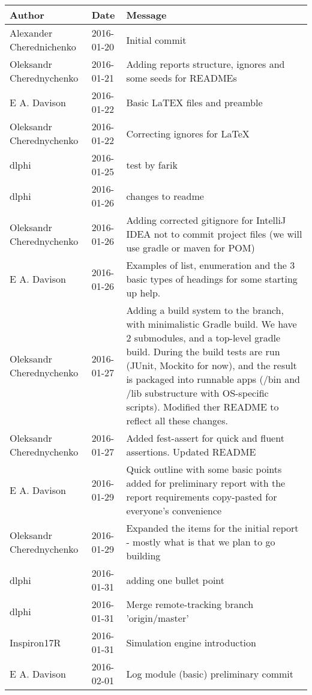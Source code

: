 \begin{center}
\begin{longtabu} to \textwidth {|
    X[3,l]|
    X[2,c]|
    X[8,l]|}
    \hline
    \textbf{Author} & \textbf{Date} & \textbf{Message} \\ \hline
Alexander Cherednichenko & 2016-01-20 & Initial commit \\ \hline
Oleksandr Cherednychenko & 2016-01-21 & Adding reports structure, ignores and some seeds for READMEs \\ \hline
E A. Davison & 2016-01-22 & Basic LaTEX files and preamble \\ \hline
Oleksandr Cherednychenko & 2016-01-22 & Correcting ignores for LaTeX \\ \hline
dlphi & 2016-01-25 & test by farik \\ \hline
dlphi & 2016-01-26 & changes to readme \\ \hline
Oleksandr Cherednychenko & 2016-01-26 & Adding corrected gitignore for IntelliJ IDEA not to commit project files (we will use gradle or maven for POM) \\ \hline
E A. Davison & 2016-01-26 & Examples of list, enumeration and the 3 basic types of headings for some starting up help. \\ \hline
Oleksandr Cherednychenko & 2016-01-27 & Adding a build system to the branch, with minimalistic Gradle build. We have 2 submodules, and a top-level gradle build. During the build tests are run (JUnit, Mockito for now), and the result is packaged into runnable apps (/bin and /lib substructure with OS-specific scripts). Modified ther README to reflect all these changes. \\ \hline
Oleksandr Cherednychenko & 2016-01-27 & Added fest-assert for quick and fluent assertions. Updated README \\ \hline
E A. Davison & 2016-01-29 & Quick outline with some basic points added for preliminary report with the report requirements copy-pasted for everyone's convenience \\ \hline
Oleksandr Cherednychenko & 2016-01-29 & Expanded the items for the initial report - mostly what is that we plan to go building \\ \hline
dlphi & 2016-01-31 & adding one bullet point \\ \hline
dlphi & 2016-01-31 & Merge remote-tracking branch 'origin/master' \\ \hline
Inspiron17R & 2016-01-31 & Simulation engine introduction \\ \hline
E A. Davison & 2016-02-01 & Log module (basic) preliminary commit \\ \hline

\end{longtabu}
\end{center}
